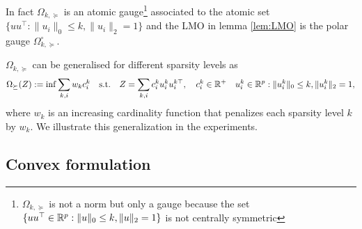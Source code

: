 In fact $\Omega_{k,\succeq}$ is an atomic gauge\footnote{$\Omega_{k,\succeq}$ is not a norm but only a gauge because the set $\{u u^\top \in\mathbb{R}^p  :   \|u\|_0 \leq k, \|u\|_2 = 1\}$  is not centrally symmetric} associated to the atomic set $\{uu^{\top}  : \|u_{i}\|_0 \leq k, \|u_{i}\|_2 = 1\}$ and the LMO in lemma \ref{lem:LMO} is the polar gauge $\Omega^{\circ}_{k,\succeq}$.

$\Omega_{k,\succeq}$ can be generalised for different sparsity levels as
\begin{align}
\Omega_{\succeq}(Z):=\inf \sum_{k,i}w_{k}c_i^k \quad \text{s.t.} \quad Z=\sum_{k,i} c_i^k u_i^k u_{i}^{k\top}, \quad c_i^k\in \mathbb{R}^{+} \quad u_{i}^k\in\mathbb{R}^p  :   \|u_{i}^k\|_0 \leq k, \|u_{i}^k\|_2 = 1,
\end{align}
where $w_{k}$ is an increasing cardinality function that penalizes each sparsity level $k$ by $w_{k}$. We illustrate this generalization in the experiments.\\


\subsection{Convex formulation}

